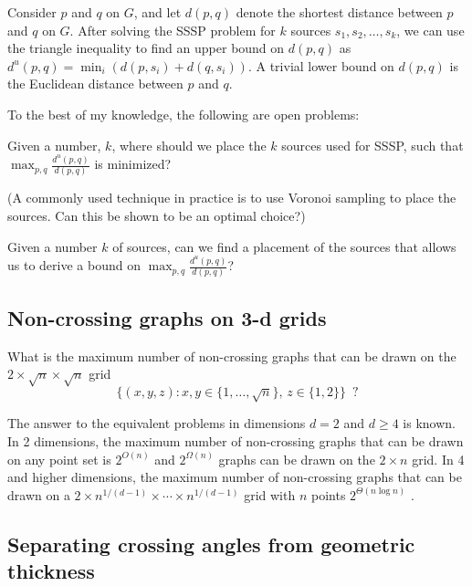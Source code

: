 \documentclass{patmorin}
\newcommand{\poser}[1]{\noindent{\textit{#1}}}
\begin{document}
Consider $p$ and $q$ on $G$, and let $d(p,q)$ denote the shortest distance
between $p$ and $q$ on $G$. After solving the SSSP problem for $k$ sources
$s_1,s_2,\ldots,s_k$, we can use the triangle inequality to find an upper
bound on $d(p,q)$ as $d^u(p,q) = \min_i(d(p,s_i)+d(q,s_i))$. A trivial
lower bound on $d(p,q)$ is the Euclidean distance between $p$ and $q$.

To the best of my knowledge, the following are open problems:

\begin{op}
Given a number, $k$, where should we place the $k$ sources used for SSSP,
such that $\max_{p,q} \frac{d^u(p,q)}{d(p,q)}$ is minimized?
\end{op}
(A commonly used technique in practice is to use Voronoi sampling to place the sources. Can this be shown to be an optimal choice?)

\begin{op}
Given a number $k$ of sources, can we find a placement
of the sources that allows us to derive a bound on $\max_{p,q}
\frac{d^u(p,q)}{d(p,q)}$?
\end{op}

\subsection{Non-crossing graphs on 3-d grids}

\poser{Vida Dujmovi\'c}

\begin{op}
  What is the maximum number of non-crossing graphs that can be
  drawn on the $2\times\sqrt{n}\times\sqrt{n}$ grid 
  \[ \{(x,y,z):
  x,y\in\{1,\ldots,\sqrt{n}\},\, z\in\{1,2\}\} \enspace ? \]
\end{op}

The answer to the equivalent problems in dimensions $d=2$ and $d\ge 4$
is known.  In 2 dimensions, the maximum number of non-crossing graphs
that can be drawn on any point set is $2^{O(n)}$ \cite{acns82} and 
$2^{\Omega(n)}$ graphs can be drawn on the $2\times n$ grid.
In 4 and higher dimensions, the maximum number of non-crossing graphs
that can be drawn on a $2\times n^{1/(d-1)}\times\cdots\times n^{1/(d-1)}$
grid with $n$ points $2^{\Theta(n\log n)}$ \cite{dms13}.

\subsection{Separating crossing angles from geometric thickness}
\end{document}
